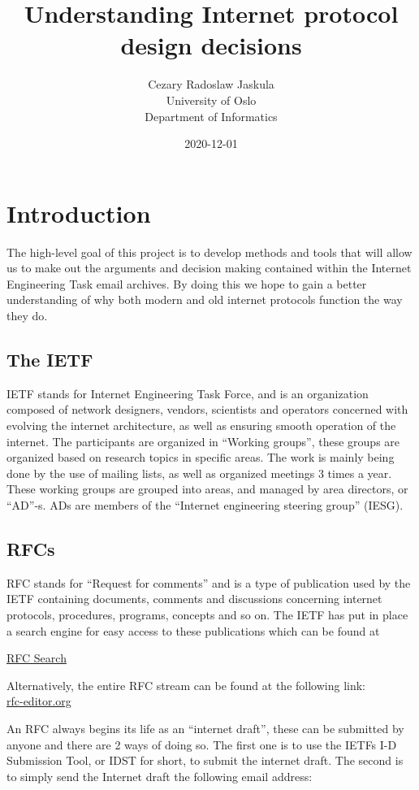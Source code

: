 \documentclass{report}
\title{Understanding Internet protocol design decisions}
\date{2020-12-01}
\author{Cezary Radoslaw Jaskula \\University of Oslo \\Department of Informatics}
\begin{document}
 \maketitle
 \chapter{Introduction}
	The high-level goal of this project is to develop methods and tools that will allow us to make out the arguments and decision making contained within the Internet Engineering Task email archives. By doing this we hope to gain a better understanding of why both modern and old internet protocols function the way they do.

\section{The IETF}
	IETF stands for Internet Engineering Task Force, and is an organization composed of network designers, vendors, scientists and operators concerned with evolving the internet architecture, as well as ensuring smooth operation of the internet. The participants are organized in  “Working groups”, these groups are organized based on research topics in specific areas. The work is mainly being done by the use of mailing lists, as well as organized meetings 3 times a year. These working groups are grouped into areas, and managed by area directors, or “AD”-s.
ADs are members of the “Internet engineering steering group” (IESG).

\section{RFCs}
RFC stands for “Request for comments” and is a type of publication used by the IETF containing documents, comments and discussions concerning internet protocols, procedures, programs, concepts and so on. The IETF has put in place a search engine for easy access to these publications which can be found at

\href{ https://www.rfc-editor.org/search/rfc_search.phpl}{RFC Search\\}

Alternatively, the entire RFC stream can be found at the following link:\\

\href{https://www.rfc-editor.org/search/rfc_search_detail.php?stream_name=IETF&page=All}{rfc-editor.org\\}


An RFC always begins its life as an “internet draft”, these can be submitted by anyone and there are 2 ways of doing so. The first one is to use the IETFs I-D Submission Tool, or IDST for short, to submit the internet draft. The second is to simply send the Internet draft the following email address:
\end{document}
